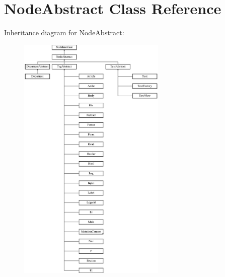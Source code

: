 \hypertarget{class_pes_1_1_dom_1_1_node_1_1_node_abstract}{}\section{Node\+Abstract Class Reference}
\label{class_pes_1_1_dom_1_1_node_1_1_node_abstract}
Inheritance diagram for Node\+Abstract\+:\begin{figure}[H]
\begin{center}
\leavevmode
\includegraphics[height=12.000000cm]{class_pes_1_1_dom_1_1_node_1_1_node_abstract}
\end{center}
\end{figure}
